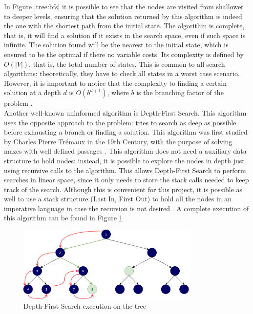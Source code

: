 In Figure \ref{tree:bfs} it is possible to see that the nodes are visited from
shallower to deeper levels, ensuring that the solution returned by this
algorithm is indeed the one with the shortest path from the initial state. The
algorithm is complete, that is, it will find a solution if it exists in the
search space, even if such space is infinite. The solution found will be the
nearest to the initial state, which is ensured to be the optimal if there no
variable costs. Its complexity is defined by $O(|V|)$, that is, the total
number of states. This is common to all search algorithms: theoretically, they
have to check all states in a worst case scenario. However, it is important to
notice that the complexity to finding a certain solution at a depth $d$ is
$O(b^{d+1})$, where $b$ is the branching factor of the problem
\cite{russel-2003-aima}.\\

Another well-known uninformed algorithm is Depth-First Search. This algorithm
uses the opposite approach to the problem: tries to search as deep as possible
before exhausting a branch or finding a solution. This algorithm was first
studied by Charles Pierre Trémaux in the 19th Century, with the purpose of
solving mazes with well defined passages \cite{even-2011-graph}. This algorithm
does not need a auxiliary data structure to hold nodes: instead, it is possible
to explore the nodes in depth just using recursive calls to the algorithm. This
allows Depth-First Search to perform searches in linear space, since it only
needs to store the stack calls needed to keep track of the search. Although
this is convenient for this project, it is possible as well to use a stack
structure (Last In, First Out) to hold all the nodes in an imperative language
in case the recursion is not desired \cite{russel-2003-aima}. A complete
execution of this algorithm can be found in Figure \ref{tree:dfs}\\

\begin{figure}[ht]
\centering
\includegraphics[width=0.8\textwidth]{img/dfs.png}
\caption{Depth-First Search execution on the tree}
\label{tree:dfs}
\end{figure}

